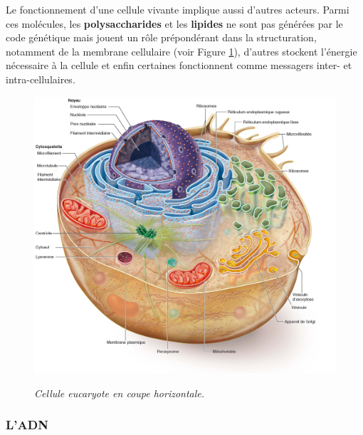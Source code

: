Le fonctionnement d'une cellule vivante implique aussi d'autres acteurs. Parmi ces molécules, les \textbf{polysaccharides} et les \textbf{lipides} ne sont pas générées par le code génétique mais jouent un rôle prépondérant dans la structuration, notamment de la membrane cellulaire (voir Figure \ref{Fig:cellule}), d'autres stockent l'énergie nécessaire à la cellule et enfin certaines fonctionnent comme messagers inter- et intra-cellulaires.

\begin{figure}
  \centering
  {\includegraphics[width=0.95\linewidth]{./figures/ch1/cellule}}
    \caption{\it Cellule eucaryote en coupe horizontale.}
    \label{Fig:cellule}
  \hspace{0.3cm}
\end{figure}


\subsubsection{L'ADN}

